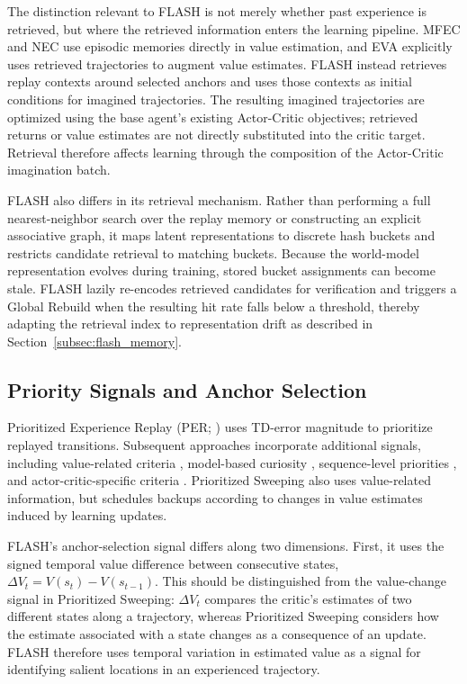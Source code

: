 \documentclass{article} %
\begin{document}
The distinction relevant to FLASH is not merely whether past experience is retrieved, but where the retrieved information enters the learning pipeline. MFEC and NEC use episodic memories directly in value estimation, and EVA explicitly uses retrieved trajectories to augment value estimates. FLASH instead retrieves replay contexts around selected anchors and uses those contexts as initial conditions for imagined trajectories. The resulting imagined trajectories are optimized using the base agent's existing Actor-Critic objectives; retrieved returns or value estimates are not directly substituted into the critic target. Retrieval therefore affects learning through the composition of the Actor-Critic imagination batch.

FLASH also differs in its retrieval mechanism. Rather than performing a full nearest-neighbor search over the replay memory or constructing an explicit associative graph, it maps latent representations to discrete hash buckets and restricts candidate retrieval to matching buckets. Because the world-model representation evolves during training, stored bucket assignments can become stale. FLASH lazily re-encodes retrieved candidates for verification and triggers a Global Rebuild when the resulting hit rate falls below a threshold, thereby adapting the retrieval index to representation drift as described in Section~\ref{subsec:flash_memory}.

\subsection{Priority Signals and Anchor Selection}

Prioritized Experience Replay (PER; \citealp{schaul2015prioritized}) uses TD-error magnitude to prioritize replayed transitions. Subsequent approaches incorporate additional signals, including value-related criteria \citep{cao2019high}, model-based curiosity \citep{kauvar2023curious}, sequence-level priorities \citep{karimpanal2018experience, brittain2019prioritized}, and actor-critic-specific criteria \citep{saglam2023actor}. Prioritized Sweeping \citep{moore1993prioritized} also uses value-related information, but schedules backups according to changes in value estimates induced by learning updates.

FLASH's anchor-selection signal differs along two dimensions. First, it uses the signed temporal value difference between consecutive states, $\Delta V_t = V(s_t)-V(s_{t-1})$. This should be distinguished from the value-change signal in Prioritized Sweeping: $\Delta V_t$ compares the critic's estimates of two different states along a trajectory, whereas Prioritized Sweeping considers how the estimate associated with a state changes as a consequence of an update. FLASH therefore uses temporal variation in estimated value as a signal for identifying salient locations in an experienced trajectory.
\end{document}
